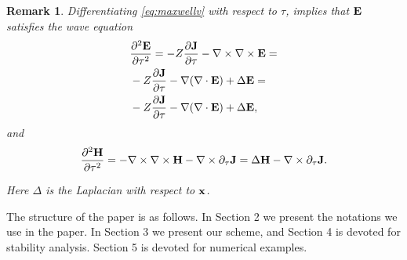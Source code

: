 \documentclass[12pt,reqno]{amsart}
\newcommand{\e}{{\bf E}}
\newcommand{\h}{{\bf H}}
\newcommand{\J}{{\bf J}}
\newtheorem{remark}[theorem]{Remark}
\newtheorem{rem}[theorem]{Remark}
\theoremstyle{definition}
\numberwithin{equation}{section}
\begin{document}
\begin{rem}\label{rem:wave_e}
	Differentiating \eqref{eq:maxwellv} with respect to $\tau$, implies that $\e$ satisfies the wave equation
	\begin{align*}
		&
	\frac{\partial^2 \e}{\partial \tau^2}=-Z\frac{\partial \J}{\partial \tau}-\nabla\times
\nabla\times \e=\\&
-Z\frac{\partial \J}{\partial \tau}-\nabla(\nabla \cdot \e)+\Delta \e=\\&
-Z\frac{\partial \J}{\partial \tau}-\nabla(\nabla \cdot \e)+\Delta \e,
	\end{align*}
and 
$$
\frac{\partial^2 \h}{\partial \tau^2}=-\nabla \times \nabla \times\h-\nabla \times \partial_{\tau}\J=
\Delta \h-\nabla \times \partial_{\tau}\J.
$$

Here $\Delta$ is the Laplacian with respect to ${\bf x}$. 
\end{rem}

The structure of the paper is as follows.
In Section 2 we present the notations we use in the paper.
In Section 3 we present our scheme, and Section 4 is devoted for stability analysis. Section 5 is devoted for numerical examples.


\end{document}
